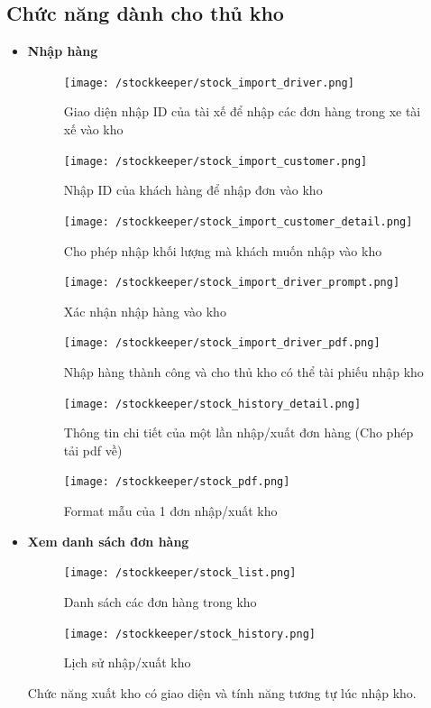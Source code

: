 \subsection{Chức năng dành cho thủ kho}
\begin{itemize}
	\item \textbf{Nhập hàng}
	\begin{figure}[H]
		\texttt{[image: /stockkeeper/stock\_import\_driver.png]}
		\centering
		\caption{Giao diện nhập ID của tài xế để nhập các đơn hàng trong xe tài xế vào kho}
	\end{figure}

	\begin{figure}[H]
		\texttt{[image: /stockkeeper/stock\_import\_customer.png]}
		\centering
		\caption{Nhập ID của khách hàng để nhập đơn vào kho}
	\end{figure}

	\begin{figure}[H]
		\texttt{[image: /stockkeeper/stock\_import\_customer\_detail.png]}
		\centering
		\caption{Cho phép nhập khối lượng mà khách muốn nhập vào kho}
	\end{figure}
	
	\begin{figure}[H]
		\texttt{[image: /stockkeeper/stock\_import\_driver\_prompt.png]}
		\centering
		\caption{Xác nhận nhập hàng vào kho}
	\end{figure}
	
	\begin{figure}[H]
		\texttt{[image: /stockkeeper/stock\_import\_driver\_pdf.png]}
		\centering
		\caption{Nhập hàng thành công và cho thủ kho có thể tài phiếu nhập kho}
	\end{figure}

	\begin{figure}[H]
		\texttt{[image: /stockkeeper/stock\_history\_detail.png]}
		\centering
		\caption{Thông tin chi tiết của một lần nhập/xuất đơn hàng (Cho phép tải pdf về)}
	\end{figure}
	
	\begin{figure}[H]
		\texttt{[image: /stockkeeper/stock\_pdf.png]}
		\centering
		\caption{Format mẫu của 1 đơn nhập/xuất kho}
	\end{figure}
	
	
	\item \textbf{Xem danh sách đơn hàng}
	\begin{figure}[H]
		\texttt{[image: /stockkeeper/stock\_list.png]}
		\centering
		\caption{Danh sách các đơn hàng trong kho}
	\end{figure}

	\begin{figure}[H]
		\texttt{[image: /stockkeeper/stock\_history.png]}
		\centering
		\caption{Lịch sử nhập/xuất kho}
	\end{figure}
	
	Chức năng xuất kho có giao diện và tính năng tương tự lúc nhập kho.
	
\end{itemize}





